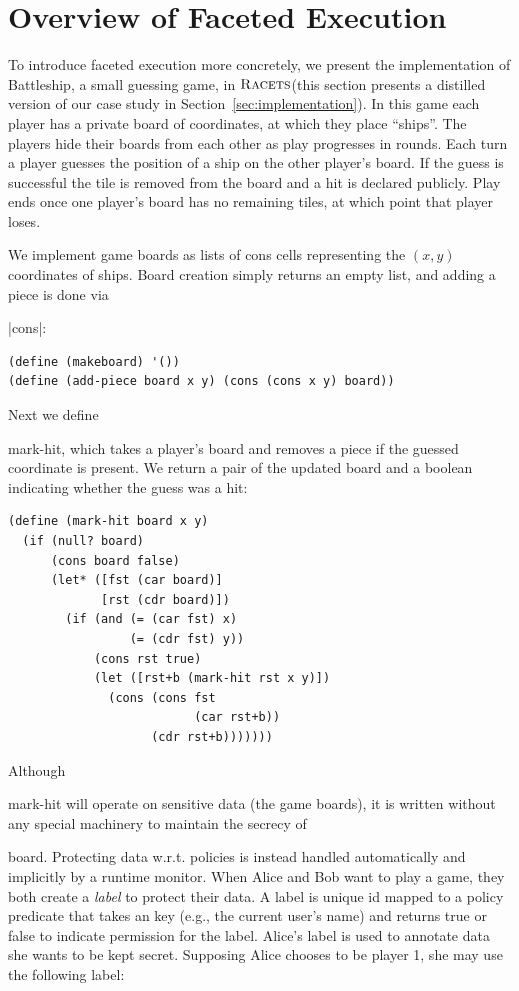 \documentclass[review=true,acmlarge]{acmart}
\newcommand*{\SavedLstInline}{}
\DeclareRobustCommand*{\lstinline}{%
  \ifmmode
    \let\SavedBGroup\bgroup
    \def\bgroup{%
      \let\bgroup\SavedBGroup
      \hbox\bgroup
    }%
  \fi
  \SavedLstInline
}
\newcommand{\colorMATH}{black!20!blue}
\newcommand{\blue}[1] {{\color{\colorMATH} #1}}
\newcommand{\code}[1]{\lstinline{#1}}
\newcommand{\racets}[0]{$\textsc{Racets}$\xspace}
\begin{document}
\section{Overview of Faceted Execution}
\label{sec:overview}

To introduce faceted execution more concretely, we present the implementation
of Battleship, a small guessing game, in \racets (this section presents a
distilled version of our case study in
Section~\ref{sec:implementation}). In this game each player has a
private board of coordinates, at which they place ``ships''. The players
hide their boards from each other as play progresses in rounds. Each
turn a player guesses the position of a ship on the other player's
board. If the guess is successful the tile is removed from the
board and a hit is declared publicly. Play ends once one player's board
has no remaining tiles, at which point that player loses.

We implement game boards as lists of cons cells representing the
\blue{$(x,y)$} coordinates of ships. Board creation simply returns an empty
list, and adding a piece is done via \lstinline|cons|:

\begin{lstlisting}[language=Racket,escapechar=|,name=example]
(define (makeboard) '())
(define (add-piece board x y) (cons (cons x y) board))
\end{lstlisting}

Next we define \code{mark-hit}, which takes a player's board and
removes a piece if the guessed coordinate is present. We 
return a pair of the updated board and a boolean indicating
whether the guess was a hit:

\begin{lstlisting}[language=Racket,escapechar=|,name=example]
(define (mark-hit board x y)
  (if (null? board)
      (cons board false)
      (let* ([fst (car board)]
             [rst (cdr board)])
        (if (and (= (car fst) x)
                 (= (cdr fst) y))
            (cons rst true)
            (let ([rst+b (mark-hit rst x y)])
              (cons (cons fst
                          (car rst+b))
                    (cdr rst+b)))))))
\end{lstlisting}

Although \code{mark-hit} will operate on sensitive data (the game
boards), it is written without any special machinery to maintain the
secrecy of \code{board}. Protecting data {w.r.t.} policies is instead handled
automatically and implicitly by a runtime monitor.
When Alice and Bob want to play a game, they both create a
\emph{label} to protect their data. A label is unique id mapped to a policy predicate
that takes an key (e.g., the current user's name) and returns true or false to indicate
permission for the label. Alice's label is used to annotate data she wants
to be kept secret. Supposing Alice chooses to be player 1, she may use the
following label:
\end{document}

